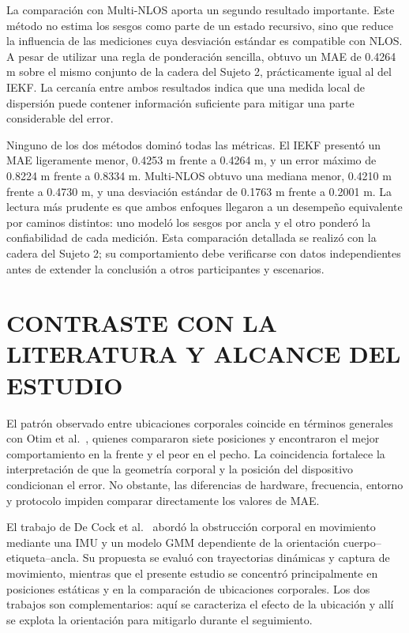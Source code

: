 La comparación con Multi-NLOS aporta un segundo resultado importante. Este método no estima los sesgos como parte de un estado recursivo, sino que reduce la influencia de las mediciones cuya desviación estándar es compatible con NLOS. A pesar de utilizar una regla de ponderación sencilla, obtuvo un MAE de 0.4264 m sobre el mismo conjunto de la cadera del Sujeto 2, prácticamente igual al del IEKF. La cercanía entre ambos resultados indica que una medida local de dispersión puede contener información suficiente para mitigar una parte considerable del error.

Ninguno de los dos métodos dominó todas las métricas. El IEKF presentó un MAE ligeramente menor, 0.4253 m frente a 0.4264 m, y un error máximo de 0.8224 m frente a 0.8334 m. Multi-NLOS obtuvo una mediana menor, 0.4210 m frente a 0.4730 m, y una desviación estándar de 0.1763 m frente a 0.2001 m. La lectura más prudente es que ambos enfoques llegaron a un desempeño equivalente por caminos distintos: uno modeló los sesgos por ancla y el otro ponderó la confiabilidad de cada medición. Esta comparación detallada se realizó con la cadera del Sujeto 2; su comportamiento debe verificarse con datos independientes antes de extender la conclusión a otros participantes y escenarios.

\section{CONTRASTE CON LA LITERATURA Y ALCANCE DEL ESTUDIO}
\label{sec:comparacion_estado_arte}

El patrón observado entre ubicaciones corporales coincide en términos generales con Otim et al.~\cite{ref14}, quienes compararon siete posiciones y encontraron el mejor comportamiento en la frente y el peor en el pecho. La coincidencia fortalece la interpretación de que la geometría corporal y la posición del dispositivo condicionan el error. No obstante, las diferencias de hardware, frecuencia, entorno y protocolo impiden comparar directamente los valores de MAE.

El trabajo de De Cock et al.~\cite{Tanghe2023} abordó la obstrucción corporal en movimiento mediante una IMU y un modelo GMM dependiente de la orientación cuerpo--etiqueta--ancla. Su propuesta se evaluó con trayectorias dinámicas y captura de movimiento, mientras que el presente estudio se concentró principalmente en posiciones estáticas y en la comparación de ubicaciones corporales. Los dos trabajos son complementarios: aquí se caracteriza el efecto de la ubicación y allí se explota la orientación para mitigarlo durante el seguimiento.

